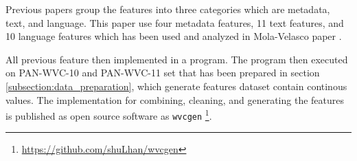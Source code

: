 Previous papers group the features into three categories which are metadata,
text, and language.
This paper use four metadata features, 11 text features, and 10
language features which has been used and analyzed in Mola-Velasco paper
\cite{mola2012wikipedia}.

All previous feature then implemented in a program.
The program then executed on PAN-WVC-10 and PAN-WVC-11 set that has been
prepared in section \ref{subsection:data_preparation}, which generate features
dataset contain continous values.
The implementation for combining, cleaning, and generating the features is
published as open source software as \texttt{wvcgen}
\footnote{\url{https://github.com/shuLhan/wvcgen}}.
